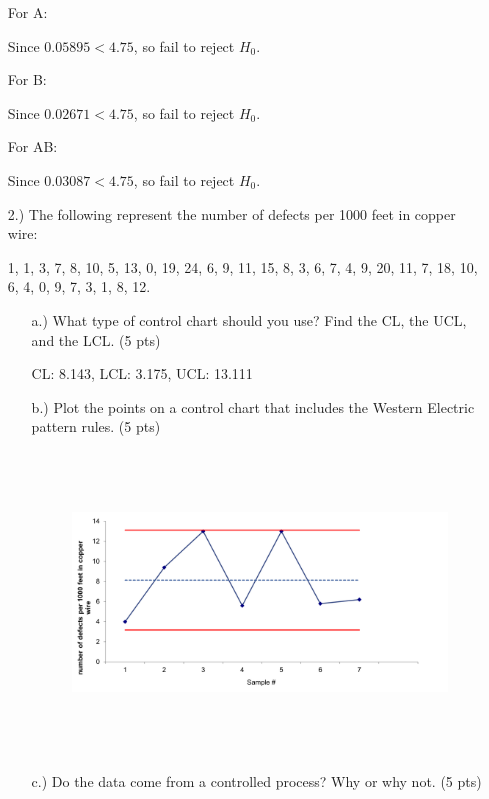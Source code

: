 \documentclass{article}
\begin{document}
\begin{enumerate}
        For A:

        Since $0.05895 < 4.75$, so fail to reject $H_0$.

        For B:

        Since $0.02671 < 4.75$, so fail to reject $H_0$.

        For AB: 

        Since $0.03087 < 4.75$, so fail to reject $H_0$.

    \newpage

    \item[2.)] The following represent the number of defects per 1000 feet in copper wire:
    
    1, 1, 3, 7, 8, 10, 5, 13, 0, 19, 24, 6, 9, 11, 15, 8, 3, 6, 7, 4, 9, 20, 11, 7, 18, 10, 6, 4, 0, 9, 7, 3, 1, 8, 12.
    \begin{enumerate}

        \item[a.)] What type of control chart should you use? Find the CL, the UCL, and the LCL. (5 pts)
        
        CL: 8.143, LCL: 3.175, UCL: 13.111

        \item[b.)] Plot the points on a control chart that includes the Western Electric pattern rules. (5 pts)
        
        \begin{figure}[!htbp]
            \centerline{\includegraphics[width=10cm,height=8cm,keepaspectratio]{Picture 3.png}}
        \end{figure}

        \item[c.)] Do the data come from a controlled process? Why or why not. (5 pts)
        

\end{enumerate}
\end{enumerate}
\end{document}

